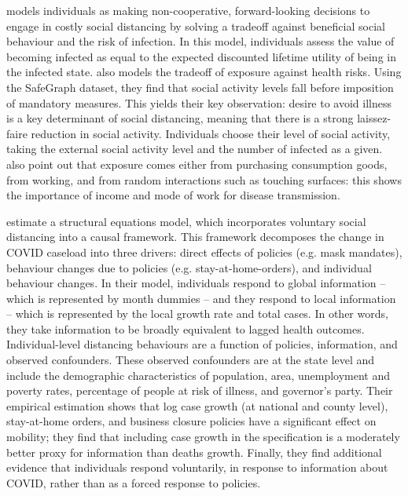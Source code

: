 \documentclass[12pt,a4]{article}
\begin{document}
\textcite{toxvaerdEquilibriumSocialDistancing2020} models individuals as making non-cooperative, forward-looking decisions to engage in costly social distancing by solving a tradeoff against beneficial social behaviour and the risk of infection. In this model, individuals assess the value of becoming infected as equal to the expected discounted lifetime utility of being in the infected state.\textcite{farboodiInternalExternalEffects2020} also models the tradeoff of exposure against health risks. Using the SafeGraph dataset, they find that social activity levels fall before imposition of mandatory measures. This yields their key observation: desire to avoid illness is a key determinant of social distancing, meaning that there is a strong laissez-faire reduction in social activity. Individuals choose their level of social activity, taking the external social activity level and the number of infected as a given. \textcite{eichenbaumMacroeconomicsEpidemics2020} also point out that exposure comes either from purchasing consumption goods, from working, and from random interactions such as touching surfaces: this shows the importance of income and mode of work for disease transmission. 

\textcite{chernozhukovCausalImpactMasks2021} estimate a structural equations model, which incorporates voluntary social distancing into a causal framework. This framework decomposes the change in COVID caseload into three drivers: direct effects of policies (e.g. mask mandates), behaviour changes due to policies (e.g. stay-at-home-orders), and individual behaviour changes. In their model, individuals respond to global information -- which is represented by month dummies -- and they respond to local information -- which is represented by the local growth rate and total cases. In other words, they take information to be broadly equivalent to lagged health outcomes. Individual-level distancing behaviours are a function of policies, information, and observed confounders. These observed confounders are at the state level and include the demographic characteristics of population, area, unemployment and poverty rates, percentage of people at risk of illness, and governor's party. Their empirical estimation shows that log case growth (at national and county level), stay-at-home orders, and business closure policies have a significant effect on mobility; they find that including case growth in the specification is a moderately better proxy for information than deaths growth. Finally, they find additional evidence that individuals respond voluntarily, in response to information about COVID, rather than as a forced response to policies.
\end{document}
